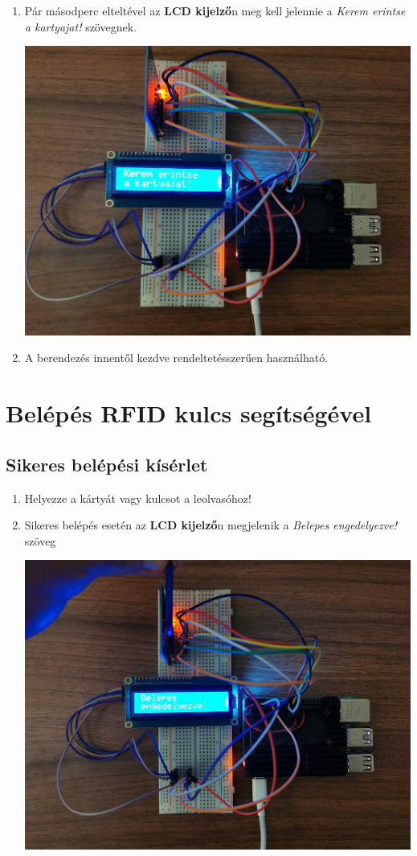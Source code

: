 \documentclass[11pt, a4paper]{article}
\begin{document}
\begin{enumerate}
\begin{minipage}{\linewidth}
				\label{fig:2indul}
			\end{minipage}
			\item Pár másodperc elteltével az \textbf{LCD kijelző}n meg kell jelennie a \emph{Kerem erintse a kartyajat!} szövegnek. \\
			\begin{minipage}{\linewidth}
				\centering
				\includegraphics[width=0.7\linewidth]{img/3_futas}
				\label{fig:3futas}
			\end{minipage}
			\item A berendezés innentől kezdve rendeltetésszerűen használható. \\
		\end{enumerate}
		
	\section{Belépés RFID kulcs segítségével}
		\subsection{Sikeres belépési kísérlet}
			\begin{enumerate}
				\justifying
				\item Helyezze a kártyát vagy kulcsot a leolvasóhoz!
				\item Sikeres belépés esetén az \textbf{LCD kijelző}n megjelenik a \emph{Belepes engedelyezve!} szöveg \\
				\begin{minipage}{\linewidth}
					\centering
					\includegraphics[width=0.7\linewidth]{img/4_engedelyezett}
					\label{fig:4engedelyezett}
				\end{minipage}
				\end{enumerate}
				\vfill
\end{document}
